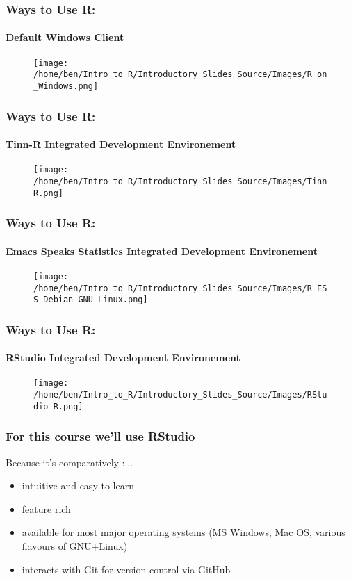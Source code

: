 \documentclass[xcolor=dvipsnames]{beamer}
\begin{document}
\begin{frame}
\frametitle{Ways to Use R:}
\framesubtitle{Default Windows Client}
\begin{figure}
\texttt{[image: /home/ben/Intro\_to\_R/Introductory\_Slides\_Source/Images/R\_on\_Windows.png]}
\end{figure}
\end{frame}

\begin{frame}
\frametitle{Ways to Use R:}
\framesubtitle{Tinn-R Integrated Development Environement}
\begin{figure}
\texttt{[image: /home/ben/Intro\_to\_R/Introductory\_Slides\_Source/Images/TinnR.png]}
\end{figure}
\end{frame}

\begin{frame}
\frametitle{Ways to Use R:}
\framesubtitle{Emacs Speaks Statistics Integrated Development Environement}
\begin{figure}
\texttt{[image: /home/ben/Intro\_to\_R/Introductory\_Slides\_Source/Images/R\_ESS\_Debian\_GNU\_Linux.png]}
\end{figure}
\end{frame}

\begin{frame}
\frametitle{Ways to Use R:}
\framesubtitle{RStudio Integrated Development Environement}
\begin{figure}
\texttt{[image: /home/ben/Intro\_to\_R/Introductory\_Slides\_Source/Images/RStudio\_R.png]}
\end{figure}
\end{frame}

\begin{frame}
\frametitle{For this course we'll use RStudio}
Because it's comparatively :...
\begin{itemize}
\item intuitive and easy to learn
\item feature rich
\item available for most major operating systems (MS Windows, Mac OS, various flavours of GNU+Linux)
\item interacts with Git for version control via GitHub
\end{itemize}

\end{frame}
\end{document}
